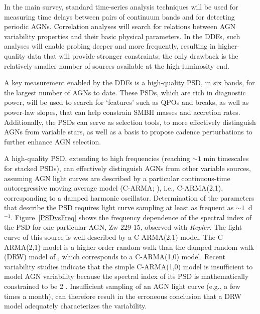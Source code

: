 In the main survey, standard time-series analysis techniques will be used for
measuring time delays between pairs of continuum bands and for detecting
periodic AGNs. Correlation analyses will search for relations between AGN
variability properties and their basic physical parameters. In the DDFs, such
analyses will enable probing deeper and more frequently, resulting in
higher-quality data that will provide stronger constraints; the only drawback is
the relatively smaller number of sources available at the high-luminosity end.

A key measurement enabled by the DDFs is a high-quality PSD, in six bands,
for the largest number of AGNs to date. These PSDs, which are rich
in diagnostic power, will be used to search for `features' such as QPOs
and breaks, as well as power-law slopes, that can help constrain SMBH masses
and accretion rates. Additionally, the PSDs can serve as selection
tools, to more effectively distinguish AGNs from variable stars, as
well as a basis to propose cadence perturbations to further enhance
AGN selection.

A high-quality PSD, extending to high frequencies (reaching $\sim 1$ min
timescales for stacked PSDs), can effectively distinguish AGNs from other
variable sources, assuming AGN light curves are described by a particular
continuous-time autoregressive moving average model (C-ARMA; \citet{KellyEtal14}),
i.e., C-ARMA(2,1), corresponding to a damped harmonic oscillator.
%
Determination of the parameters that describe the PSD requires light curve
sampling at least as frequent as $\sim1$~d$^{-1}$. Figure~\ref{PSDvsFreq} shows
the frequency dependence of the spectral index of the PSD for one particular AGN,
Zw 229-15, observed with {\em Kepler}. The light curve of this source is
well-described by a C-ARMA(2,1) model. The C-ARMA(2,1) model is a higher order
random walk than the damped random walk (DRW) model of \citet{Kelly09}, which
corresponds to a C-ARMA(1,0) model. Recent variability studies indicate that
the simple C-ARMA(1,0) model is insufficient to model AGN variability because
the spectral index of its PSD is mathematically constrained to be 2
\citep{KellyEtal14,Kasliwal15,Simm15}. Insufficient sampling of an AGN light
curve (e.g., a few times a month), can therefore result in the erroneous conclusion
that a DRW model adequately characterizes the variability.

